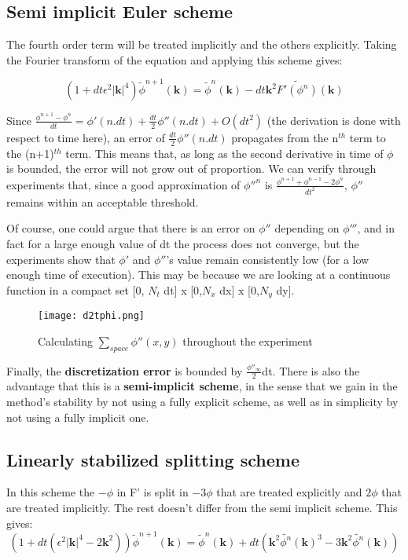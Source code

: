 \documentclass[11pt,a4paper]{report}
\begin{document}
\subsection{Semi implicit Euler scheme}
The fourth order term will be treated implicitly and the others explicitly. Taking the Fourier transform of the equation and applying this scheme gives: 

$$(1+dt\epsilon^2|\textbf{k}|^4)\tilde{\phi}^{n+1}(\textbf{k})=\tilde{\phi}^n(\textbf{k})-dt\textbf{k}^2\tilde{F'(\phi^n)}(\textbf{k})$$

Since $\frac{\phi^{n+1}-\phi^n}{dt} = \phi'(n.dt) + \frac{dt}{2}\phi''(n.dt) + O(dt^2)$ (the derivation is done with respect to time here), an error of $\frac{dt}{2}\phi''(n.dt)$ propagates from the n$^{th}$ term to the (n+1)$^{th}$ term. This means that, as long as the second derivative in time of $\phi$ is bounded, the error will not grow out of proportion. We can verify through experiments that, since a good approximation of $\phi''^n$ is $\frac{\phi^{n+1}+\phi^{n-1}-2\phi^n}{dt^2}$, $\phi''$ remains within an acceptable threshold.

Of course, one could argue that there is an error on $\phi''$ depending on $\phi'''$, and in fact for a large enough value of dt the process does not converge, but the experiments show that $\phi'$ and $\phi''$'s value remain consistently low (for a low enough time of execution). This may be because we are looking at a continuous function in a compact set [0, $N_t$ dt] x [0,$N_x$ dx] x [0,$N_y$ dy].

\begin{figure}[h!]
\centering
\texttt{[image: d2tphi.png]}
\caption{Calculating $\sum_{space}\phi''(x,y)$ throughout the experiment}
\end{figure}

Finally, the \textbf{discretization error} is bounded by $\frac{\phi''_\infty}{2}$dt. There is also the advantage that this is a \textbf{semi-implicit scheme}, in the sense that we gain in the method's stability by not using a fully explicit scheme, as well as in simplicity by not using a fully implicit one.

\subsection{Linearly stabilized splitting scheme}
In this scheme the $-\phi$ in F' is split in $-3\phi$ that are treated explicitly and $2\phi$ that are treated implicitly. The rest doesn't differ from the semi implicit scheme. This gives:
$$(1+dt(\epsilon^2|\textbf{k}|^4-2\textbf{k}^2))\tilde{\phi}^{n+1}(\textbf{k})=\tilde{\phi}^n(\textbf{k})+dt(\textbf{k}^2\tilde{{\phi^n}}(\textbf{k})^3-3\textbf{k}^2\tilde{\phi^n}(\textbf{k}))$$
\end{document}
